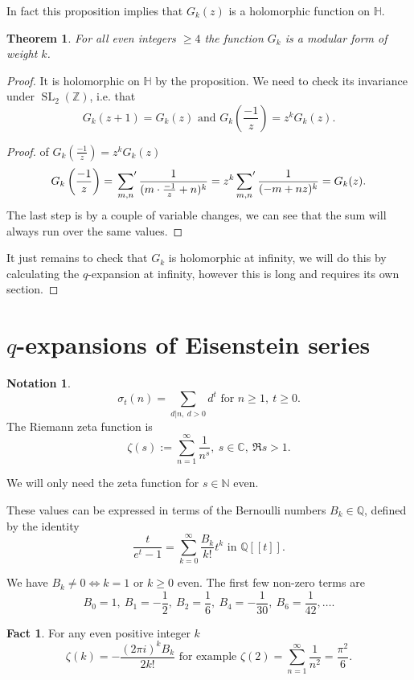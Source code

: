 \documentclass{article}
\newtheorem*{thm}{Theorem}
\theoremstyle{definition}
\newtheorem*{nota}{Notation}
\newtheorem*{fact}{Fact}
\DeclareMathOperator{\SL}{SL}
\begin{document}
In fact this proposition implies that $G_k(z)$ is a holomorphic function on $\mathbb{H}$.

\begin{thm}
For all even integers $\ge 4$ the function $G_k$ is a modular form of weight $k$.
\end{thm}

\begin{proof}
It is holomorphic on $\mathbb{H}$ by the proposition.
We need to check its invariance under $\SL_2(\mathbb{Z})$, i.e. that
\[G_k(z+1) = G_k(z) \text{ and } G_k\left(\frac{-1}{z}\right) = z^kG_k(z).\]
\begin{proof} of $G_k(\frac{-1}{z}) = z^kG_k(z)$
\[G_k\left(\frac{-1}{z}\right) = \sideset{}{'}\sum_{m,n} \frac{1}{(m\cdot\frac{-1}{z} + n)^k} = z^k\sideset{}{'}\sum_{m,n}\frac{1}{(-m + nz)^k} = G_k(z).\]
The last step is by a couple of variable changes, we can see that the sum will always run over the same values.
\end{proof}

It just remains to check that $G_k$ is holomorphic at infinity, we will do this by calculating the $q$-expansion at infinity, however this is long and requires its own section.
\end{proof}

\section{$q$-expansions of Eisenstein series}
\begin{nota}
\[\sigma_t(n) = \sum_{d|n,\ d > 0} d^t \text{ for } n\ge 1,\ t\ge 0.\]
The Riemann zeta function is
\[\zeta(s) := \sum_{n=1}^{\infty} \frac{1}{n^s},\ s\in\mathbb{C},\ \Re s > 1.\]
\end{nota}

We will only need the zeta function for $s\in \mathbb{N}$ even.

These values can be expressed in terms of the Bernoulli numbers $B_k\in\mathbb{Q}$, defined by the identity
\[\frac{t}{e^t - 1} = \sum_{k=0}^{\infty}\frac{B_k}{k!}t^k\text{ in } \mathbb{Q}[[t]].\]

We have $B_k\ne 0\iff k=1$ or $k\ge 0$ even.
The first few non-zero terms are
\[B_0 = 1,\ B_1= -\frac{1}{2},\ B_2=\frac{1}{6},\ B_4=-\frac{1}{30},\ B_6=\frac{1}{42},\ldots.\]

\begin{fact}
For any even positive integer $k$
\[\zeta(k) = -\frac{(2\pi i)^kB_k}{2k!}\text{ for example } \zeta(2) = \sum_{n=1}^\infty \frac{1}{n^2} = \frac{\pi^2}{6}.\]
\end{fact}
\end{document}
